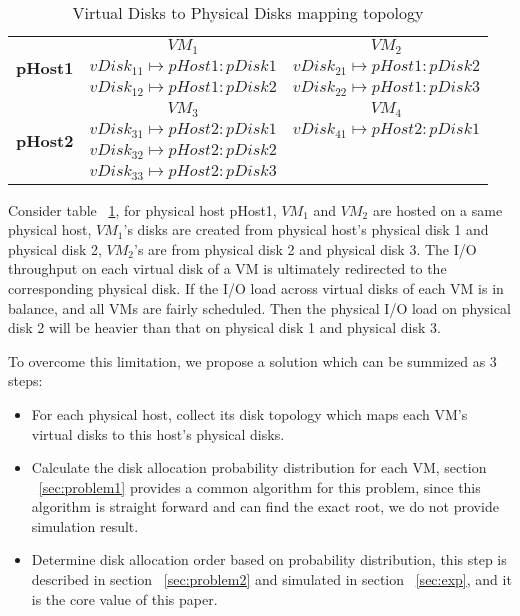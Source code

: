 \documentclass[11pt,a4paper]{article}
\begin{document}
\begin{table}
\centering
\caption{Virtual Disks to Physical Disks mapping topology}
\begin{tabular}{|c|c|c|}
\hline
\multirow{3}{*}{\textbf{pHost1}} &  \textbf{$VM_1$} & \textbf{$VM_2$} \\
\cline{2-3}
                        & $vDisk_{11} \mapsto pHost1:pDisk1$ & $vDisk_{21} \mapsto pHost1:pDisk2$ \\
                        & $vDisk_{12} \mapsto pHost1:pDisk2$ & $vDisk_{22} \mapsto pHost1:pDisk3$ \\
\hline
\multirow{4}{*}{\textbf{pHost2}} & \textbf{$VM_3$} & \textbf{$VM_4$} \\
\cline{2-3}
                        & $vDisk_{31} \mapsto pHost2:pDisk1$ & $vDisk_{41} \mapsto pHost2:pDisk1$ \\
                        & $vDisk_{32} \mapsto pHost2:pDisk2$ & \\
                        & $vDisk_{33} \mapsto pHost2:pDisk3$ & \\
\hline
\end{tabular}
\label{table:origindata}
\end{table}

Consider table ~\ref {table:origindata}, for physical host pHost1,
\textbf{$VM_1$} and \textbf{$VM_2$} are hosted on a same physical 
host, \textbf{$VM_1$}'s disks are created from physical host's physical disk 1 and 
physical disk 2, \textbf{$VM_2$}'s are from physical disk 2 and physical disk 3. 
The I/O throughput on each virtual disk of a VM is ultimately redirected 
to the corresponding physical disk. If the I/O load across virtual disks of 
each VM is in balance, and all VMs are fairly scheduled. 
Then the physical I/O load on physical disk 2 will be heavier than that on 
physical disk 1 and physical disk 3.

To overcome this limitation, we propose a solution which can be summized as 3 steps:

\begin{itemize}
\item For each physical host, collect its disk topology which maps each VM's virtual disks
  to this host's physical disks.
\item Calculate the disk allocation probability distribution for each VM, section ~\ref{sec:problem1}
  provides a common algorithm for this problem, since this algorithm is straight forward and can 
  find the exact root, we do not provide simulation result.
\item Determine disk allocation order based on probability distribution, this step is 
  described in section ~\ref{sec:problem2} and simulated in section ~\ref{sec:exp},
  and it is the core value of this paper.
\end{itemize}
\end{document}
